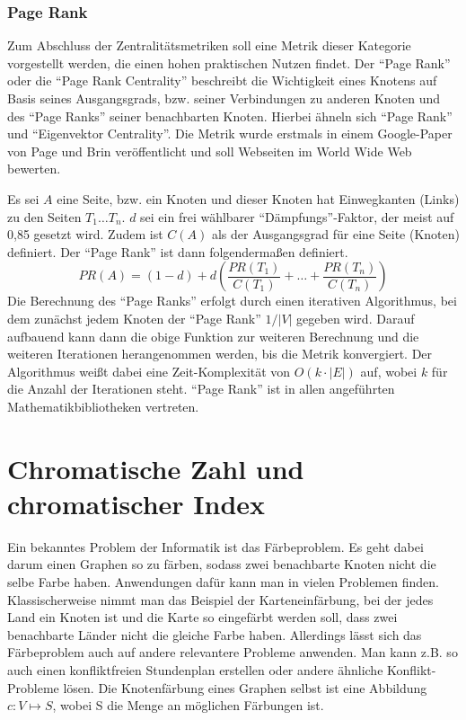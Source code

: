 \documentclass[a4paper,12pt,ngerman,chapterprefix=false,listof=totoc,bibliography=totoc]{scrreprt}
\begin{document}
\subsubsection*{Page Rank}
{
Zum Abschluss der Zentralitätsmetriken soll eine Metrik dieser Kategorie vorgestellt werden, die einen hohen praktischen Nutzen findet. Der "`Page Rank"' oder die "`Page Rank Centrality"' beschreibt die Wichtigkeit eines Knotens auf Basis seines Ausgangsgrads, bzw. seiner Verbindungen zu anderen Knoten und des "`Page Ranks"' seiner benachbarten Knoten. Hierbei ähneln sich "`Page Rank"' und "`Eigenvektor Centrality"'. Die Metrik wurde erstmals in einem Google-Paper von Page und Brin veröffentlicht und soll Webseiten im World Wide Web bewerten. \cite{brin_anatomy_1998}

Es sei \(A\) eine Seite, bzw. ein Knoten und dieser Knoten hat Einwegkanten (Links) zu den Seiten \(T_1\dots T_n\). \(d\) sei ein frei wählbarer "`Dämpfungs"'-Faktor, der meist auf 0,85 gesetzt wird. Zudem ist \(C(A)\) als der Ausgangsgrad für eine Seite (Knoten) definiert. Der "`Page Rank"' ist dann folgendermaßen definiert.
\[
	PR(A) = (1-d)+d(\frac{PR(T_1)}{C(T_1)}+\dots +\frac{PR(T_n)}{C(T_n)})
\]
Die Berechnung des "`Page Ranks"' erfolgt durch einen iterativen Algorithmus, bei dem zunächst jedem Knoten der "`Page Rank"' \(1/|V|\) gegeben wird. Darauf aufbauend kann dann die obige Funktion zur weiteren Berechnung und die weiteren Iterationen herangenommen werden, bis die Metrik konvergiert. Der Algorithmus weißt dabei eine Zeit-Komplexität von \(O(k\cdot |E|)\) auf, wobei \(k\) für die Anzahl der Iterationen steht. \cite{oracle_pagerank_2017} "`Page Rank"' ist in allen angeführten Mathematikbibliotheken vertreten. \cite{sagemath_generic_nodate,wolfram_graph_2020,matlab_measure_2020}
}
\section{Chromatische Zahl und chromatischer Index}
{
Ein bekanntes Problem der Informatik ist das Färbeproblem. Es geht dabei darum einen Graphen so zu färben, sodass zwei benachbarte Knoten nicht die selbe Farbe haben. Anwendungen dafür kann man in vielen Problemen finden. Klassischerweise nimmt man das Beispiel der Karteneinfärbung, bei der jedes Land ein Knoten ist und die Karte so eingefärbt werden soll, dass zwei benachbarte Länder nicht die gleiche Farbe haben. Allerdings lässt sich das Färbeproblem auch auf andere relevantere Probleme anwenden. Man kann z.B. so auch einen konfliktfreien Stundenplan erstellen oder andere ähnliche Konflikt-Probleme lösen. Die Knotenfärbung eines Graphen selbst ist eine Abbildung \(c: V\mapsto S\), wobei S die Menge an möglichen Färbungen ist. \cite{diestel_graphentheorie_2000,aigner_graphentheorie_2015} 
}
\end{document}
